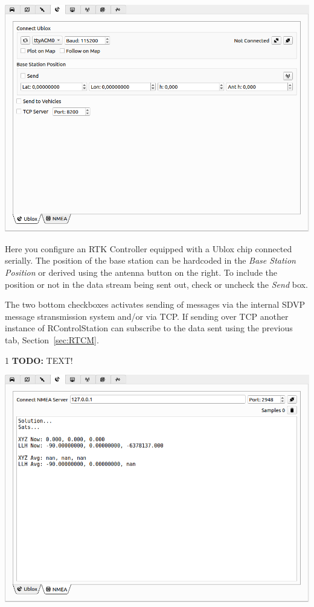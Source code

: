 \documentclass[12pt]{article} %
\def\printtodos{0}
\newcommand{\todo}[1]{
  \if\printtodos1
      {\color{red} \textbf{TODO:} #1}
  \fi}
\begin{document}
\noindent\begin{minipage}{0.5\linewidth}
\noindent \includegraphics[width=\textwidth]{./screens/base_station_UBLOX.png}
\end{minipage}
\begin{minipage}{0.5\linewidth}
  Here you configure an RTK Controller equipped with a Ublox chip
  connected serially.  The position of the base station can be
  hardcoded in the {\em Base Station Position} or derived using the
  antenna button on the right. To include the position or not in the
  data stream being sent out, check or uncheck the {\em Send} box.

  The two bottom checkboxes activates sending of messages via the
  internal SDVP message stransmission system and/or via TCP. If
  sending over TCP another instance of RControlStation can subscribe
  to the data sent using the previous tab, Section~\ref{sec:RTCM}.
\end{minipage}

\noindent\begin{minipage}{0.5\linewidth}
  \todo{TEXT!}
\end{minipage}
\noindent\begin{minipage}{0.5\linewidth}
\noindent \includegraphics[width=\textwidth]{./screens/base_station_NMEA.png}
\end{minipage}
\end{document}
